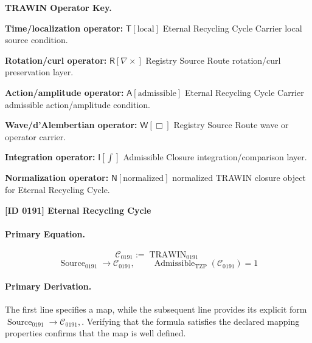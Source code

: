 \par\vspace{0.45\baselineskip}
\noindent\begin{minipage}[t]{\linewidth}
\begingroup
\small
\raggedright
\textbf{TRAWIN Operator Key.}\par
\noindent\textbf{Time/localization operator:} $\mathsf{T}\!\left[\mathrm{local}\right]$ Eternal Recycling Cycle Carrier local source condition.\par
\noindent\textbf{Rotation/curl operator:} $\mathsf{R}\!\left[\nabla\times\right]$ Registry Source Route rotation/curl preservation layer.\par
\noindent\textbf{Action/amplitude operator:} $\mathsf{A}\!\left[\mathrm{admissible}\right]$ Eternal Recycling Cycle Carrier admissible action/amplitude condition.\par
\noindent\textbf{Wave/d'Alembertian operator:} $\mathsf{W}\!\left[\Box\right]$ Registry Source Route wave or operator carrier.\par
\noindent\textbf{Integration operator:} $\mathsf{I}\!\left[\int\right]$ Admissible Closure integration/comparison layer.\par
\noindent\textbf{Normalization operator:} $\mathsf{N}\!\left[\mathrm{normalized}\right]$ normalized TRAWIN closure object for Eternal Recycling Cycle.\par
\endgroup
\end{minipage}

\clearpage
\noindent\textbf{[ID 0191] Eternal Recycling Cycle}\par
\vspace{0.35em}
\paragraph{Primary Equation.}
\[
\mathcal{C}_{0191} := \operatorname{TRAWIN}_{0191}
\]
\[
\operatorname{Source}_{0191}\longrightarrow \mathcal{C}_{0191},
\qquad
\operatorname{Admissible}_{\mathrm{TZP}}\!\left(\mathcal{C}_{0191}\right)=1
\]

\paragraph{Primary Derivation.}
The first line specifies a map, while the subsequent line provides its explicit form \( \operatorname{Source}_{0191}\longrightarrow \mathcal{C}_{0191}, \). Verifying that the formula satisfies the declared mapping properties confirms that the map is well defined.
